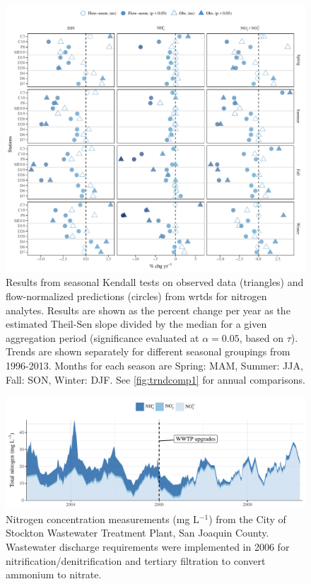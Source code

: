 \documentclass[journal = esthag, manuscript = article]{achemso}\usepackage[]{graphicx}\usepackage[]{color}
\begin{document}
\begin{suppinfo}
\begin{figure}
\centering
\includegraphics[width=1\textwidth,page=1]{figs/trndcomp3.pdf}
\caption{Results from seasonal Kendall tests on observed data (triangles) and flow-normalized predictions (circles) from \ac{wrtds} for nitrogen analytes. Results are shown as the percent change per year as the estimated Theil-Sen slope divided by the median for a given aggregation period (significance evaluated at $\alpha = 0.05$, based on $\tau$). Trends are shown separately for different seasonal groupings from 1996-2013. Months for each season are Spring: MAM, Summer: JJA, Fall: SON, Winter: DJF. See \cref{fig:trndcomp1} for annual comparisons.}
\label{fig:trndcomp3}   
\end{figure}

\begin{figure}[!ht]

{\centering \includegraphics[width=\textwidth]{figs/stock-1} 

}

\caption[Nitrogen concentration measurements (mg L$^{-1}$) from the City of Stockton Wastewater Treatment Plant, San Joaquin County]{Nitrogen concentration measurements (mg L$^{-1}$) from the City of Stockton Wastewater Treatment Plant, San Joaquin County.  Wastewater discharge requirements were implemented in 2006 for nitrification/denitrification and tertiary filtration to convert ammonium to nitrate.}\label{fig:stock}
\end{figure}



\end{suppinfo}
\end{document}
